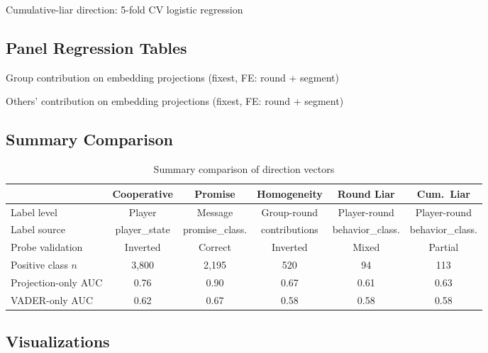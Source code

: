 \documentclass[11pt,oneside]{article}
\begin{document}
\begin{table}[H]
\caption{Cumulative-liar direction: 5-fold CV logistic regression}
\label{tab:reg_cliar}

\end{table}

\subsection{Panel Regression Tables}

\begin{table}[H]
\caption{Group contribution on embedding projections (fixest, FE: round + segment)}
\label{tab:panel_group}

\end{table}

\begin{table}[H]
\caption{Others' contribution on embedding projections (fixest, FE: round + segment)}
\label{tab:panel_others}

\end{table}

\subsection{Summary Comparison}

\begin{table}[H]
\centering
\caption{Summary comparison of direction vectors}
\label{tab:comparison}
\footnotesize
\begin{tabular}{lccccc}
\toprule
& Cooperative & Promise & Homogeneity & Round Liar & Cum.\ Liar \\
\midrule
Label level & Player & Message & Group-round & Player-round & Player-round \\
Label source & player\_state & promise\_class. & contributions & behavior\_class. & behavior\_class. \\
Probe validation & Inverted & Correct & Inverted & Mixed & Partial \\
Positive class $n$ & 3,800 & 2,195 & 520 & 94 & 113 \\
Projection-only AUC & 0.76 & 0.90 & 0.67 & 0.61 & 0.63 \\
VADER-only AUC & 0.62 & 0.67 & 0.58 & 0.58 & 0.58 \\
\bottomrule
\end{tabular}
\end{table}

\subsection{Visualizations}
\end{document}
